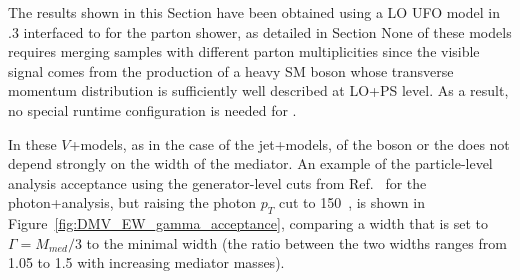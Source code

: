 


The results shown in this Section
have been obtained using a LO UFO model in .3 interfaced to \pythiaEight
for the parton shower, as detailed in Section\cite{sec:EW_implementation}
None of these models requires merging samples with different parton multiplicities  
since the visible signal comes from the production of a heavy SM boson whose transverse momentum distribution is sufficiently 
well described at LO+PS level.  As a result, no special runtime configuration is needed for \pythiaEight. 

In these $V$+\MET models, as in the case of the jet+\MET models, \pT of the boson or the \MET does not depend 
strongly on the width of the mediator. An example of the particle-level analysis acceptance using the
generator-level cuts from Ref.~\cite{Aad:2014tda}
for the photon+\MET analysis, but raising the photon $p_T$ cut
to 150~\gev, is shown in Figure~\ref{fig:DMV_EW_gamma_acceptance},
comparing a width that is set to $\Gamma=M_{med}/3$ to the
minimal width (the ratio between the two widths
ranges from 1.05 to 1.5 with increasing mediator masses).

